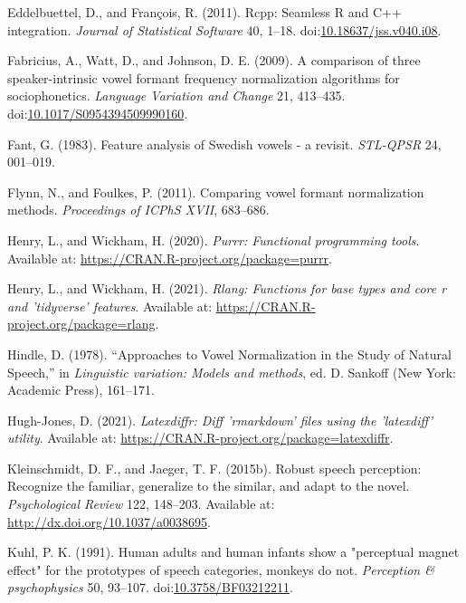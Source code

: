 \documentclass[utf8]{frontiers_suppmat} %
\newlength{\cslhangindent}
\newlength{\cslentryspacingunit} %
\newenvironment{CSLReferences}[2] %
 {%
  \setlength{\parindent}{0pt}
  \ifodd #1
  \let\oldpar\par
  \def\par{\hangindent=\cslhangindent\oldpar}
  \fi
  \setlength{\parskip}{#2\cslentryspacingunit}
 }%
 {}
\begin{document}
\begin{CSLReferences}{1}{0}
\leavevmode{}%
Eddelbuettel, D., and François, R. (2011). {Rcpp}: Seamless {R} and {C++} integration. \emph{Journal of Statistical Software} 40, 1--18. doi:\href{https://doi.org/10.18637/jss.v040.i08}{10.18637/jss.v040.i08}.

\leavevmode{}%
Fabricius, A., Watt, D., and Johnson, D. E. (2009). A comparison of three speaker-intrinsic vowel formant frequency normalization algorithms for sociophonetics. \emph{Language Variation and Change} 21, 413--435. doi:\href{https://doi.org/10.1017/S0954394509990160}{10.1017/S0954394509990160}.

\leavevmode{}%
Fant, G. (1983). Feature analysis of {Swedish} vowels - a revisit. \emph{STL-QPSR} 24, 001--019.

\leavevmode{}%
Flynn, N., and Foulkes, P. (2011). Comparing vowel formant normalization methods. \emph{Proceedings of ICPhS XVII}, 683--686.

\leavevmode{}%
Henry, L., and Wickham, H. (2020). \emph{Purrr: Functional programming tools}. Available at: \url{https://CRAN.R-project.org/package=purrr}.

\leavevmode{}%
Henry, L., and Wickham, H. (2021). \emph{Rlang: Functions for base types and core r and 'tidyverse' features}. Available at: \url{https://CRAN.R-project.org/package=rlang}.

\leavevmode{}%
Hindle, D. (1978). {``Approaches to {Vowel Normalization} in the {Study} of {Natural Speech},''} in \emph{Linguistic variation: Models and methods}, ed. D. Sankoff ({New York}: {Academic Press}), 161--171.

\leavevmode{}%
Hugh-Jones, D. (2021). \emph{Latexdiffr: Diff 'rmarkdown' files using the 'latexdiff' utility}. Available at: \url{https://CRAN.R-project.org/package=latexdiffr}.

\leavevmode{}%
Kleinschmidt, D. F., and Jaeger, T. F. (2015b). Robust speech perception: Recognize the familiar, generalize to the similar, and adapt to the novel. \emph{Psychological Review} 122, 148--203. Available at: \url{http://dx.doi.org/10.1037/a0038695}.

\leavevmode{}%
Kuhl, P. K. (1991). Human adults and human infants show a "perceptual magnet effect" for the prototypes of speech categories, monkeys do not. \emph{Perception \& psychophysics} 50, 93--107. doi:\href{https://doi.org/10.3758/BF03212211}{10.3758/BF03212211}.


\end{CSLReferences}
\end{document}
